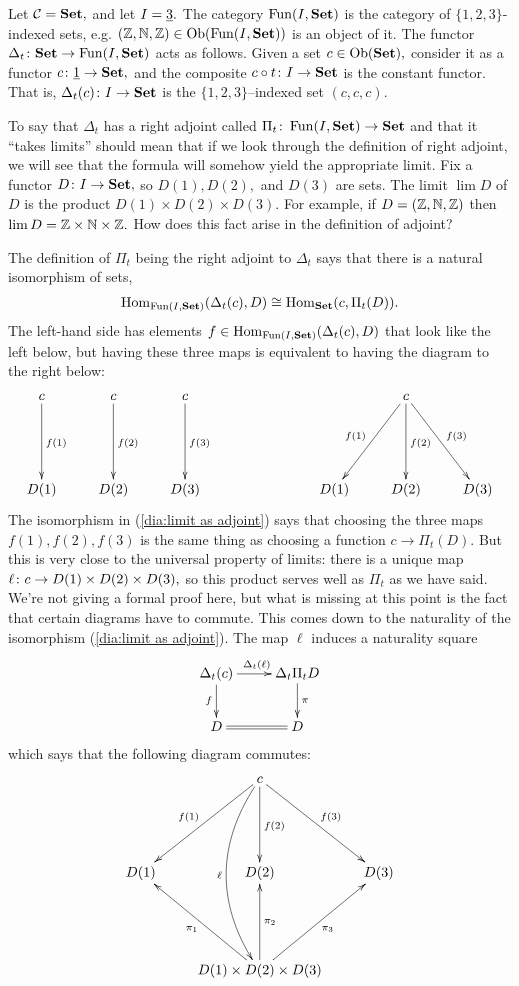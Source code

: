\documentclass[../main/CT4S-EN-RU]{subfiles}
\begin{document}
\begin{exampleENG}
Let $\mathcal{C}={\mathbf{Set}},$ and let $I=\underline{3}.$ The category $\operatorname{Fun}(I,{\mathbf{Set}})$ is the category of $\{1,2,3\}$-indexed sets, e.g. $({\mathbb Z},{\mathbb N},{\mathbb Z})\in\operatorname{Ob}(\operatorname{Fun}(I,{\mathbf{Set}}))$ is an object of it. The functor $\Delta_t\colon{\mathbf{Set}}\rightarrow\operatorname{Fun}(I,{\mathbf{Set}})$ acts as follows. Given a set $c\in\operatorname{Ob}({\mathbf{Set}}),$ consider it as a functor $c\colon\underline{1}\rightarrow{\mathbf{Set}},$ and the composite $c\circ t\colon I\rightarrow{\mathbf{Set}}$ is the constant functor. That is, $\Delta_t(c)\colon I\rightarrow{\mathbf{Set}}$ is the $\{1,2,3\}$--indexed set $(c,c,c).$

To say that $\Delta_t$ has a right adjoint called $\Pi_t\colon\operatorname{Fun}(I,{\mathbf{Set}})\rightarrow{\mathbf{Set}}$ and that it “takes limits” should mean that if we look through the definition of right adjoint, we will see that the formula will somehow yield the appropriate limit. Fix a functor $D\colon I\rightarrow{\mathbf{Set}},$ so $D(1),D(2),$ and $D(3)$ are sets. The limit $\lim D$ of $D$ is the product $D(1)\times D(2)\times D(3).$ For example, if $D=({\mathbb Z},{\mathbb N},{\mathbb Z})$ then $\lim D={\mathbb Z}\times{\mathbb N}\times{\mathbb Z}.$ How does this fact arise in the definition of adjoint?

The definition of $\Pi_t$ being the right adjoint to $\Delta_t$ says that there is a natural isomorphism of sets, 
\begin{align}\label{dia:limit as adjoint}
\operatorname{Hom}_{\operatorname{Fun}(I,{\mathbf{Set}})}(\Delta_t(c),D)\cong\operatorname{Hom}_{\mathbf{Set}}(c,\Pi_t(D)).
\end{align}
The left-hand side has elements $f\in\operatorname{Hom}_{\operatorname{Fun}(I,{\mathbf{Set}})}(\Delta_t(c),D)$ that look like the left below, but having these three maps is equivalent to having the diagram to the right below:
$$\xymatrix{
c\ar[dd]^{f(1)}&c\ar[dd]^{f(2)}&c\ar[dd]^{f(3)}\\\\
D(1)&D(2)&D(3)
}
\hspace{1in}
\xymatrix{
&c\ar[ddl]_{f(1)}\ar[dd]^{f(2)}\ar[ddr]^{f(3)}\\\\
D(1)&D(2)&D(3)
}$$
The isomorphism in (\ref{dia:limit as adjoint}) says that choosing the three maps $f(1),f(2),f(3)$ is the same thing as choosing a function $c\to\Pi_t(D).$ But this is very close to the universal property of limits: there is a unique map $\ell\colon c\rightarrow D(1)\times D(2)\times D(3),$ so this product serves well as $\Pi_t$ as we have said. We're not giving a formal proof here, but what is missing at this point is the fact that certain diagrams have to commute. This comes down to the naturality of the isomorphism (\ref{dia:limit as adjoint}). The map $\ell$ induces a naturality square
$$\xymatrix{\Delta_t(c)\ar[r]^{\Delta_t(\ell)}\ar[d]_f&\Delta_t\Pi_tD\ar[d]^\pi\\D\ar@{=}[r]&D}$$
which says that the following diagram commutes:
$$\xymatrix{&c\ar[ddl]_{f(1)}\ar[dd]^{f(2)}\ar[ddr]^{f(3)}\ar@/_2pc/[dddd]_\ell\\\\
D(1)&D(2)&D(3)\\\\
&D(1)\times D(2)\times D(3)\ar[uul]^{\pi_1}\ar[uu]_{\pi_2}\ar[uur]_{\pi_3}
}$$
\end{exampleENG}
\end{document}

